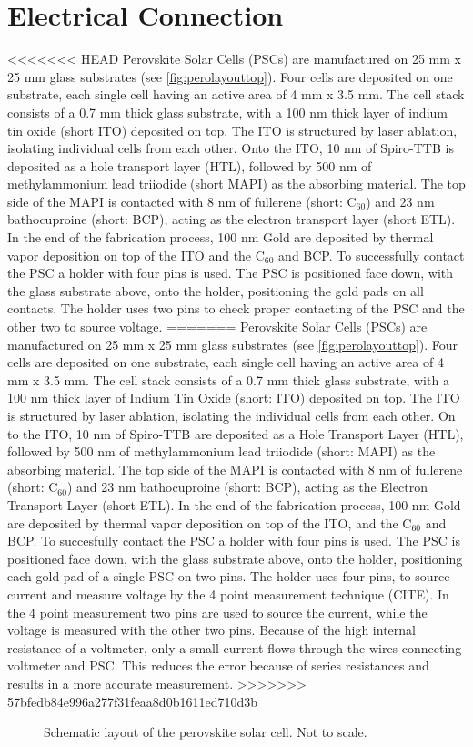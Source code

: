 \section{Electrical Connection}\label{sec:electricalconnection}
<<<<<<< HEAD
Perovskite Solar Cells (PSCs) are manufactured on 25 mm x 25 mm glass substrates (see \autoref{fig:perolayouttop}). Four cells are deposited on one substrate, each single cell having an active area of 4 mm x 3.5 mm. The cell stack consists of a 0.7 mm thick glass substrate, with a 100 nm thick layer of indium tin oxide (short ITO) deposited on top. The ITO is structured by laser ablation, isolating individual cells from each other. Onto the ITO, 10 nm of Spiro-TTB is deposited as a hole transport layer (HTL), followed by 500 nm of methylammonium lead triiodide (short MAPI) as the absorbing material. The top side of the MAPI is contacted with 8 nm of fullerene (short: C$_{60}$) and 23 nm bathocuproine (short: BCP), acting as the electron transport layer (short ETL). In the end of the fabrication process, 100 nm Gold are deposited by thermal vapor deposition on top of the ITO and the C$_{60}$ and BCP. To successfully contact the PSC a holder with four pins is used. The PSC is positioned face down, with the glass substrate above, onto the holder, positioning the gold pads on all contacts. The holder uses two pins to check proper contacting of the PSC and the other two to source voltage.
=======
Perovskite Solar Cells (PSCs) are manufactured on 25 mm x 25 mm glass substrates (see \autoref{fig:perolayouttop}). Four cells are deposited on one substrate, each single cell having an active area of 4 mm x 3.5 mm. The cell stack consists of a 0.7 mm thick glass substrate, with a 100 nm thick layer of Indium Tin Oxide (short: ITO) deposited on top. The ITO is structured by laser ablation, isolating the individual cells from each other. On to the ITO, 10 nm of Spiro-TTB are deposited as a Hole Transport Layer (HTL), followed by 500 nm of methylammonium lead triiodide (short: MAPI) as the absorbing material. The top side of the MAPI is contacted with 8 nm of fullerene (short: C$_{60}$) and 23 nm bathocuproine (short: BCP), acting as the Electron Transport Layer (short ETL). In the end of the fabrication process, 100 nm Gold are deposited by thermal vapor deposition on top of the ITO, and the C$_{60}$ and BCP. To succesfully contact the PSC a holder with four pins is used. The PSC is positioned face down, with the glass substrate above, onto the holder, positioning each gold pad of a single PSC on two pins. The holder uses four pins, to source current and measure voltage by the 4 point measurement technique (CITE). In the 4 point measurement two pins are used to source the current, while the voltage is measured with the other two pins. Because of the high internal resistance of a voltmeter, only a small current flows through the wires connecting voltmeter and PSC. This reduces the error because of series resistances and results in a more accurate measurement.
>>>>>>> 57bfedb84e996a277f31feaa8d0b1611ed710d3b
\begin{figure}
	\centering
	
	\caption{Schematic layout of the perovskite solar cell. Not to scale.}
	\label{fig:perolayouttop}
\end{figure}

